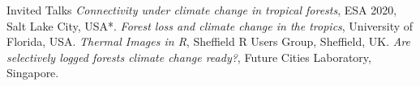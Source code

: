 \begin{rubric}{Invited Talks}
\entry*[2020] \emph{Connectivity under climate change in tropical forests}, ESA 2020, Salt Lake City, USA*.
\entry*[2019] \emph{Forest loss and climate change in the tropics}, University of Florida, USA.
\entry*[2017] \emph{Thermal Images in R}, Sheffield R Users Group, Sheffield, UK.
\entry*[2016] \emph{Are selectively logged forests climate change ready?}, Future Cities Laboratory, Singapore.
\end{rubric}